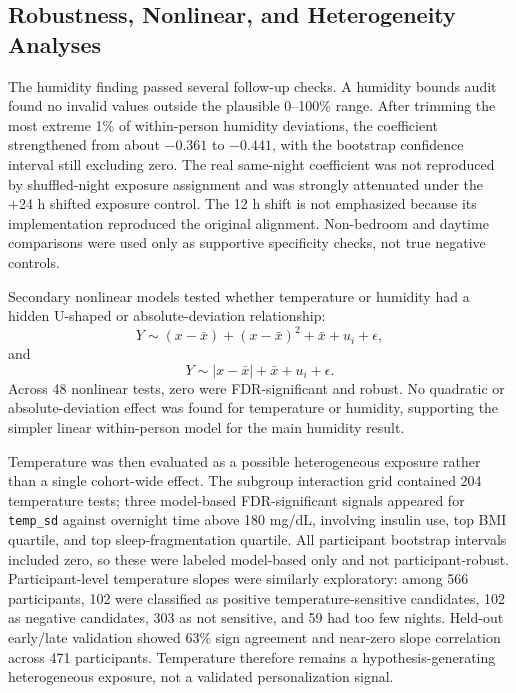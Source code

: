 \subsection{Robustness, Nonlinear, and Heterogeneity Analyses}
\label{subsec:env_robustness}

The humidity finding passed several follow-up checks. A humidity bounds audit
found no invalid values outside the plausible 0--100\% range. After trimming
the most extreme 1\% of within-person humidity deviations, the coefficient
strengthened from about $-0.361$ to $-0.441$, with the bootstrap confidence
interval still excluding zero. The real same-night coefficient was not
reproduced by shuffled-night exposure assignment and was strongly attenuated
under the +24 h shifted exposure control. The 12 h shift is not emphasized
because its implementation reproduced the original alignment. Non-bedroom and
daytime comparisons were used only as supportive specificity checks, not true
negative controls.

Secondary nonlinear models tested whether temperature or humidity had a hidden
U-shaped or absolute-deviation relationship:
\begin{equation}
Y \sim (x-\bar{x}) + (x-\bar{x})^2 + \bar{x} + u_i + \epsilon,
\end{equation}
and
\begin{equation}
Y \sim |x-\bar{x}| + \bar{x} + u_i + \epsilon.
\end{equation}
Across 48 nonlinear tests, zero were FDR-significant and robust. No quadratic
or absolute-deviation effect was found for temperature or humidity, supporting
the simpler linear within-person model for the main humidity result.

Temperature was then evaluated as a possible heterogeneous exposure rather than
a single cohort-wide effect. The subgroup interaction grid contained 204
temperature tests; three model-based FDR-significant signals appeared for
\texttt{temp\_sd} against overnight time above 180 mg/dL, involving insulin
use, top BMI quartile, and top sleep-fragmentation quartile. All participant
bootstrap intervals included zero, so these were labeled model-based only and
not participant-robust. Participant-level temperature slopes were similarly
exploratory: among 566 participants, 102 were classified as positive
temperature-sensitive candidates, 102 as negative candidates, 303 as not
sensitive, and 59 had too few nights. Held-out early/late validation showed
63\% sign agreement and near-zero slope correlation across 471 participants.
Temperature therefore remains a hypothesis-generating heterogeneous exposure,
not a validated personalization signal.

